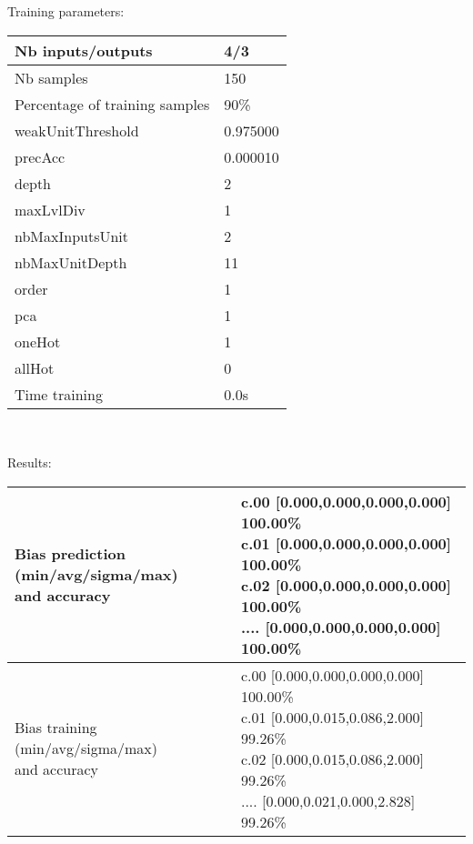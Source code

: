 Training parameters:\\
\begin{center}
\begin{tabular}{|l|l|}
\hline
Nb inputs/outputs&4/3\\
\hline
Nb samples&150\\
\hline
Percentage of training samples&90\%\\
\hline
weakUnitThreshold&0.975000\\
\hline
precAcc&0.000010\\
\hline
depth&2\\
\hline
maxLvlDiv&1\\
\hline
nbMaxInputsUnit&2\\
\hline
nbMaxUnitDepth&11\\
\hline
order&1\\
\hline
pca&1\\
\hline
oneHot&1\\
\hline
allHot&0\\
\hline
Time training&0.0s\\
\hline
\end{tabular}\\
\end{center}\newline
Results:
\begin{center}
\begin{tabular}{|l|l|}
\hline
\makecell{Bias prediction (min/avg/sigma/max)\\and accuracy}&\makecell{c.00 [0.000,0.000,0.000,0.000] 100.00\%\\
c.01 [0.000,0.000,0.000,0.000] 100.00\%\\
c.02 [0.000,0.000,0.000,0.000] 100.00\%\\
.... [0.000,0.000,0.000,0.000] 100.00\%\\
}\\

\hline
\makecell{Bias training (min/avg/sigma/max)\\and accuracy}&\makecell{c.00 [0.000,0.000,0.000,0.000] 100.00\%\\
c.01 [0.000,0.015,0.086,2.000] 99.26\%\\
c.02 [0.000,0.015,0.086,2.000] 99.26\%\\
.... [0.000,0.021,0.000,2.828] 99.26\%\\
}\\
\hline
\end{tabular}\
\end{center}
